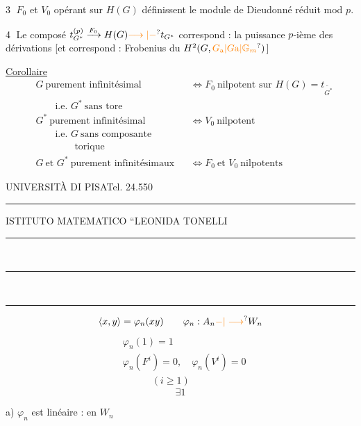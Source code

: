 \textcircled{3} $F_0$ et $V_0$ opérant sur $H(G)$ définissent le module de Dieudonné  réduit mod $p$.

\textcircled{4} Le composé $t_{G^*}^{(p)}\xrightarrow{F_0}H(G)\unsure{\longrightarrow|\mathord{-}}t_{G^*}$ correspond : la puissance $p$-ième des dérivations [et correspond : Frobenius du $H^2(G,\unsure{G_{\mathrm a}|G\mathrm a|\mathbb G_m})$]


\uline{Corollaire}
\[
\begin{aligned}
&G\ \text{purement infinitésimal}&&\Longleftrightarrow F_0\ \text{nilpotent sur }H(G)=t_{\widetilde{G^*}}\\
&\qquad\text{i.e. }G^*\ \text{sans tore}\\
&G^*\ \text{purement infinitésimal}&&\Longleftrightarrow V_0\ \text{nilpotent}\\
&\qquad\text{i.e. }G\ \text{sans composante}\\[-2pt]
&\qquad\qquad\text{torique}\\
&G\ \text{et }G^*\ \text{purement infinitésimaux}&&\Longleftrightarrow F_0\ \text{et }V_0\ \text{nilpotents}
\end{aligned}
\]

\noindent UNIVERSITÀ DI PISA\hfill Tel. 24.550

\noindent\hspace{5em}\rule{3em}{0.3pt}

\noindent ISTITUTO MATEMATICO ``LEONIDA TONELLI\quotedblbase

\noindent\hspace{4em}\rule{2.1em}{0.3pt}\,\rule{0.4em}{1.2pt}\,\rule{2.1em}{0.3pt}

\[
\langle x,y\rangle=\varphi_n(xy)\qquad \varphi_n:A_n\unsure{\mathord{-}|\longrightarrow}W_n
\]
\[
\boxed{\begin{aligned}
&\varphi_n(1)=1\\
&\varphi_n(F^i)=0,\quad\varphi_n(V^i)=0\\
&\hspace{3em}(i\geqslant1)
\end{aligned}}
\]
\[
\exists 1
\]

a) $\varphi_n$ est  linéaire : \uline{} en $W_n$

